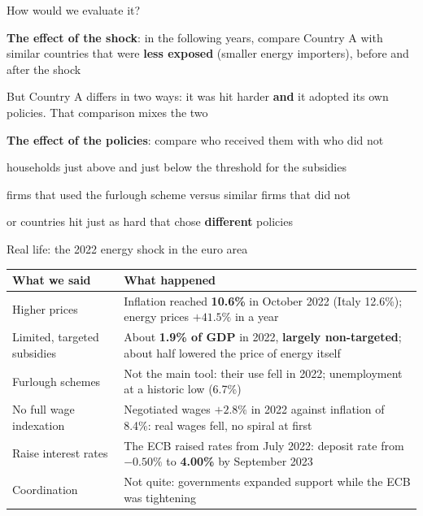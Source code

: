\documentclass[aspectratio=169,xcolor=table]{beamer}
\begin{document}
\begin{frame}{How would we evaluate it?}
\bi
  \item \textbf{The effect of the shock}: in the following years, compare Country A with similar countries that were \textbf{less exposed} (smaller energy importers), before and after the shock
  \item But Country A differs in two ways: it was hit harder \textbf{and} it adopted its own policies. That comparison mixes the two
  \item \textbf{The effect of the policies}: compare who received them with who did not
  \bi
    \item households just above and just below the threshold for the subsidies
    \item firms that used the furlough scheme versus similar firms that did not
    \item or countries hit just as hard that chose \textbf{different} policies
  \ei
\ei
\end{frame}

\begin{frame}{Real life: the 2022 energy shock in the euro area}
\footnotesize
\renewcommand{\arraystretch}{1.05}
\begin{tabular}{L{4.0cm}L{8.6cm}}
\toprule
\textbf{What we said} & \textbf{What happened} \\
\midrule
Higher prices & Inflation reached \textbf{10.6\%} in October 2022 (Italy 12.6\%); energy prices $+41.5\%$ in a year \\
Limited, targeted subsidies & About \textbf{1.9\% of GDP} in 2022, \textbf{largely non-targeted}; about half lowered the price of energy itself \\
Furlough schemes & Not the main tool: their use fell in 2022; unemployment at a historic low (6.7\%) \\
No full wage indexation & Negotiated wages $+2.8\%$ in 2022 against inflation of 8.4\%: real wages fell, no spiral at first \\
Raise interest rates & The ECB raised rates from July 2022: deposit rate from $-0.50\%$ to \textbf{4.00\%} by September 2023 \\
Coordination & Not quite: governments expanded support while the ECB was tightening \\
\bottomrule
\end{tabular}
\end{frame}

\fi

\pelQuestions
\end{document}
